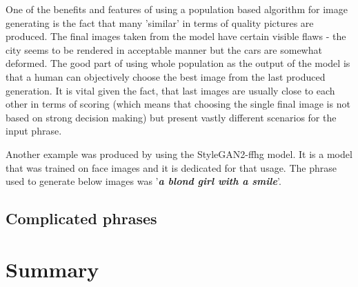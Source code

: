 \documentclass[12pt,a4paper,openany]{book}
\begin{document}
One of the benefits and features of using a population based algorithm for image generating is the fact that many 'similar' in terms of quality pictures are produced. The final images taken from the model have certain visible flaws - the city seems to be rendered in acceptable manner but the cars are somewhat deformed. The good part of using whole population as the output of the model is that a human can objectively choose the best image from the last produced generation. It is vital given the fact, that last images are usually close to each other in terms of scoring (which means that choosing the single final image is not based on strong decision making) but present vastly different scenarios for the input phrase.

Another example was produced by using the StyleGAN2-ffhg model. It is a model that was trained on face images and it is dedicated for that usage. The phrase used to generate below images was '\textit{\textbf{a blond girl with a smile}}'.




\section{Complicated phrases}


\chapter{Summary}

\end{document}
